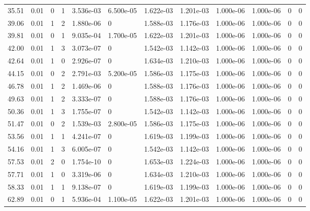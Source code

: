 \documentclass[preview]{standalone}
\begin{document}
{{\begin{tabular}{L{1.2cm}C{1.2cm} C{0.3cm}C{0.5cm} C{1.4cm}C{1.4cm} C{1.4cm}C{1.4cm} C{1.6cm}C{1.6cm} C{1.6cm}C{1.6cm}}
  35.51  &  0.01  & 0     &  1 &  3.536e-03  & 6.500e-05  &  1.622e-03&   1.201e-03& 1.000e-06 & 1.000e-06   &  0 & 0  \\ 
  39.06  &  0.01  & 1     &  2 &  1.880e-06  & 0  &  1.588e-03&   1.176e-03& 1.000e-06 & 1.000e-06   &  0 & 0  \\ 
  39.81  &  0.01  & 0     &  1 &  9.035e-04  & 1.700e-05  &  1.622e-03&   1.201e-03& 1.000e-06 & 1.000e-06   &  0 & 0  \\ 
  42.00  &  0.01  & 1     &  3 &  3.073e-07  & 0  &  1.542e-03&   1.142e-03& 1.000e-06 & 1.000e-06   &  0 & 0  \\ 
  42.64  &  0.01  & 1     &  0 &  2.926e-07  & 0  &  1.634e-03&   1.210e-03& 1.000e-06 & 1.000e-06   &  0 & 0  \\ 
  44.15  &  0.01  & 0     &  2 &  2.791e-03  & 5.200e-05  &  1.586e-03&   1.175e-03& 1.000e-06 & 1.000e-06   &  0 & 0  \\ 
  46.78  &  0.01  & 1     &  2 &  1.469e-06  & 0  &  1.588e-03&   1.176e-03& 1.000e-06 & 1.000e-06   &  0 & 0  \\ 
  49.63  &  0.01  & 1     &  2 &  3.333e-07  & 0  &  1.588e-03&   1.176e-03& 1.000e-06 & 1.000e-06   &  0 & 0  \\ 
  50.36  &  0.01  & 1     &  3 &  1.755e-07  & 0  &  1.542e-03&   1.142e-03& 1.000e-06 & 1.000e-06   &  0 & 0  \\ 
  51.47  &  0.01  & 0     &  2 &  1.539e-03  & 2.800e-05  &  1.586e-03&   1.175e-03& 1.000e-06 & 1.000e-06   &  0 & 0  \\ 
  53.56  &  0.01  & 1     &  1 &  4.241e-07  & 0  &  1.619e-03&   1.199e-03& 1.000e-06 & 1.000e-06   &  0 & 0  \\ 
  54.16  &  0.01  & 1     &  3 &  6.005e-07  & 0  &  1.542e-03&   1.142e-03& 1.000e-06 & 1.000e-06   &  0 & 0  \\ 
  57.53  &  0.01  & 2     &  0 &  1.754e-10  & 0  &  1.653e-03&   1.224e-03& 1.000e-06 & 1.000e-06   &  0 & 0  \\ 
  57.71  &  0.01  & 1     &  0 &  3.319e-06  & 0  &  1.634e-03&   1.210e-03& 1.000e-06 & 1.000e-06   &  0 & 0  \\ 
  58.33  &  0.01  & 1     &  1 &  9.138e-07  & 0  &  1.619e-03&   1.199e-03& 1.000e-06 & 1.000e-06   &  0 & 0  \\ 
  62.89  &  0.01  & 0     &  1 &  5.936e-04  & 1.100e-05  &  1.622e-03&   1.201e-03& 1.000e-06 & 1.000e-06   &  0 & 0  \\ 
\hline 
\end{tabular} 

}}
\end{document}
